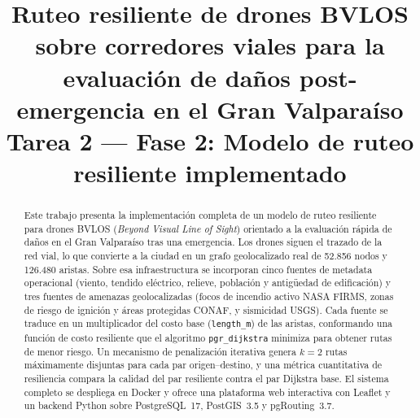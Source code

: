 \documentclass[conference]{IEEEtran}
\begin{document}
\title{Ruteo resiliente de drones BVLOS sobre corredores viales para la evaluación de daños post-emergencia en el Gran Valparaíso\\
\large Tarea 2 --- Fase 2: Modelo de ruteo resiliente implementado}

\author{
\and
{}
\and
{}
}
\maketitle

\begin{abstract}
Este trabajo presenta la implementación completa de un modelo de ruteo resiliente para drones BVLOS (\textit{Beyond Visual Line of Sight}) orientado a la evaluación rápida de daños en el Gran Valparaíso tras una emergencia. Los drones siguen el trazado de la red vial, lo que convierte a la ciudad en un grafo geolocalizado real de 52.856 nodos y 126.480 aristas. Sobre esa infraestructura se incorporan cinco fuentes de metadata operacional (viento, tendido eléctrico, relieve, población y antigüedad de edificación) y tres fuentes de amenazas geolocalizadas (focos de incendio activo NASA FIRMS, zonas de riesgo de ignición y áreas protegidas CONAF, y sismicidad USGS). Cada fuente se traduce en un multiplicador del costo base (\texttt{length\_m}) de las aristas, conformando una función de costo resiliente que el algoritmo \texttt{pgr\_dijkstra} minimiza para obtener rutas de menor riesgo. Un mecanismo de penalización iterativa genera $k=2$ rutas máximamente disjuntas para cada par origen--destino, y una métrica cuantitativa de resiliencia compara la calidad del par resiliente contra el par Dijkstra base. El sistema completo se despliega en Docker y ofrece una plataforma web interactiva con Leaflet y un backend Python sobre PostgreSQL~17, PostGIS~3.5 y pgRouting~3.7.
\end{abstract}
\end{document}
